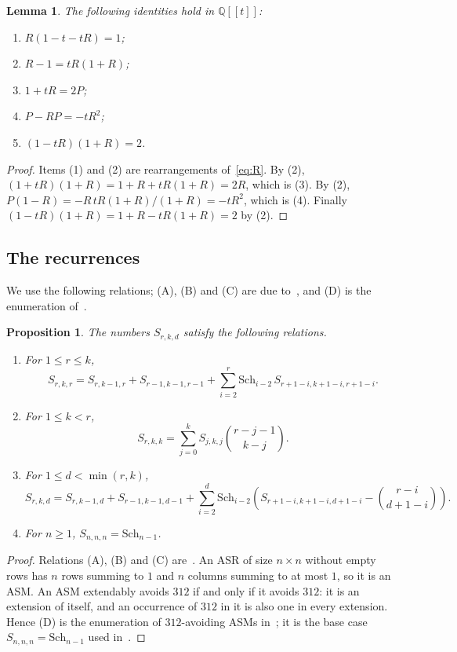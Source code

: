 \documentclass{amsart}
\newtheorem{proposition}[theorem]{Proposition}
\newtheorem{lemma}[theorem]{Lemma}
\theoremstyle{definition}
\theoremstyle{remark}
\numberwithin{equation}{section}
\newcommand{\Q}{\mathbb{Q}}
\newcommand{\Sch}{\mathrm{Sch}}
\begin{document}
\begin{lemma}\label{lem:R}
The following identities hold in $\Q[[t]]$:
\begin{enumerate}
\item $R(1-t-tR)=1$;
\item $R-1=tR(1+R)$;
\item $1+tR=2P$;
\item $P-RP=-tR^2$;
\item $(1-tR)(1+R)=2$.
\end{enumerate}
\end{lemma}

\begin{proof}
Items (1) and (2) are rearrangements of~\eqref{eq:R}. By (2), $(1+tR)(1+R)=1+R+tR(1+R)=2R$, which is (3). By (2), $P(1-R)=-R\,tR(1+R)/(1+R)=-tR^2$, which is (4). Finally $(1-tR)(1+R)=1+R-tR(1+R)=2$ by (2).
\end{proof}

\subsection{The recurrences}

We use the following relations; (A), (B) and (C) are due to~\cite{HKL}, and (D) is the enumeration of~\cite{JL07}.

\begin{proposition}\label{prop:rec}
The numbers $S_{r,k,d}$ satisfy the following relations.
\begin{enumerate}
\item[(A)] For $1\le r\le k$,
\[
S_{r,k,r}=S_{r,k-1,r}+S_{r-1,k-1,r-1}+\sum_{i=2}^{r}\Sch_{i-2}\,S_{r+1-i,k+1-i,r+1-i}.
\]
\item[(B)] For $1\le k<r$,
\[
S_{r,k,k}=\sum_{j=0}^{k}S_{j,k,j}\binom{r-j-1}{k-j}.
\]
\item[(C)] For $1\le d<\min(r,k)$,
\[
S_{r,k,d}=S_{r,k-1,d}+S_{r-1,k-1,d-1}+\sum_{i=2}^{d}\Sch_{i-2}\left(S_{r+1-i,k+1-i,d+1-i}-\binom{r-i}{d+1-i}\right).
\]
\item[(D)] For $n\ge1$, $S_{n,n,n}=\Sch_{n-1}$.
\end{enumerate}
\end{proposition}

\begin{proof}
Relations (A), (B) and (C) are~\cite[Proposition~4.2, Proposition~4.3 and Theorem~4.4]{HKL}. An ASR of size $n\times n$ without empty rows has $n$ rows summing to $1$ and $n$ columns summing to at most $1$, so it is an ASM. An ASM extendably avoids $312$ if and only if it avoids $312$: it is an extension of itself, and an occurrence of $312$ in it is also one in every extension. Hence (D) is the enumeration of $312$-avoiding ASMs in~\cite{JL07}; it is the base case $S_{n,n,n}=\Sch_{n-1}$ used in~\cite[Section~4]{HKL}.
\end{proof}
\end{document}
